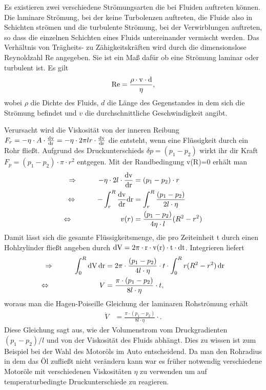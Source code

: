 \documentclass[12pt, a4paper, twoside]{scrartcl}
\begin{document}
Es existieren zwei verschiedene Strömungsarten die bei Fluiden auftreten können. Die laminare Strömung, bei der keine Turbolenzen auftreten, die Fluide also in Schichten strömen und die turbulente Strömung, bei der Verwirblungen auftreten, so dass die einzelnen Schichten eines Fluids untereinander vermischt werden.\newline
Das Verhältnis von Trägheits- zu Zähigkeitskräften wird durch die dimensionslose  Reynoldzahl Re angegeben. Sie ist ein Maß dafür ob eine Strömung laminar oder turbulent ist. Es gilt
\begin{align*}
  \rm{Re}=\frac{\rho\cdot v\cdot d}{\eta},
\end{align*}
 wobei $\rho$ die Dichte des Fluids, $d$ die Länge des Gegenstandes in dem sich die Strömung befindet und $v$ die durchschnittliche Geschwindigkeit  angibt.\linebreak
 
Verursacht wird die Viskosität von der inneren Reibung $F_r=-\eta\cdot A\cdot\frac{\rm dv}{\rm dr}=-\eta\cdot 2\pi l r\cdot\frac{\rm dv}{\rm dr}$ die entsteht, wenn eine Flüssigkeit durch ein Rohr fließt. Aufgrund des Druckunterschieds $\delta p=(p_1-p_2)$ wirkt ihr dir Kraft $F_p=(p_1-p_2)\cdot\pi\cdot r^2$ entgegen. Mit der Randbedingung v(R)=0 erhält man
\begin{align*}
\Rightarrow\hspace{1cm}-\eta\cdot2 l\cdot\frac{\rm dv}{\rm dr}&=(p_1-p_2)\cdot r \\
\Leftrightarrow\hspace{1.0cm}-\int_r^R\frac{\rm dv}{\rm dr}\rm dr&=\int_r^R\frac{(p_1-p_2)}{2l\cdot\eta} \\
\Leftrightarrow\hspace{2.35cm}v(r)&=\frac{(p_1-p_2)}{4\eta\cdot l}(R^2-r^2)
\end{align*}
Damit lässt sich die gesamte Flüssigkeitsmenge, die pro Zeiteinheit t durch einen Hohlzylinder fließt angeben durch $\rm dV=2\pi\cdot r\cdot v(r)\cdot t\cdot dt$. Integrieren liefert
\begin{align*}
\Rightarrow \hspace*{1cm}\int_0^R\rm dV\,\rm dr&=2\pi\cdot\frac{(p_1-p_2)}{4l\cdot\eta}\cdot t\cdot\int_0^Rr(R^2-r^2)\,\rm dr \\
\Leftrightarrow \hspace*{2.4cm}V&=\frac{\pi\cdot(p_1-p_2)}{8l\cdot\eta}\cdot t\rm,
\end{align*}
woraus man die Hagen-Poiseille Gleichung der laminaren Rohströmung erhält
\begin{align*}
\dot V&=\frac{\pi\cdot(p_1-p_2)}{8l\cdot\eta}\cdot.
\end{align*}
Diese Gleichung sagt aus, wie der Volumenstrom vom Druckgradienten $(p_1-p_2)/l$ und von der Viskosität des Fluids abhängt. Dies zu wissen ist zum Beispiel bei der Wahl des Motoröls im Auto entscheidend. Da man den Rohradius in dem das Öl zufließt nicht verändern kann war es früher notwendig verschiedene Motoröle mit verschiedenen Viskositäten $\eta$ zu verwenden um auf temperaturbedingte Druckunterschiede zu reagieren.
\end{document}
